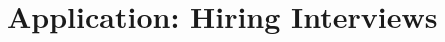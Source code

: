 \documentclass[11pt]{article}
\theoremstyle{plain}
\theoremstyle{definition}
\newcommand{\R}[0]{\mathbb R}
\newcommand{\cX}{\mathcal{X}}
\newcommand{\cC}{\mathcal{C}}
\begin{document}
\section{Application: Hiring Interviews} \label{sec:experiments}
\end{document}
